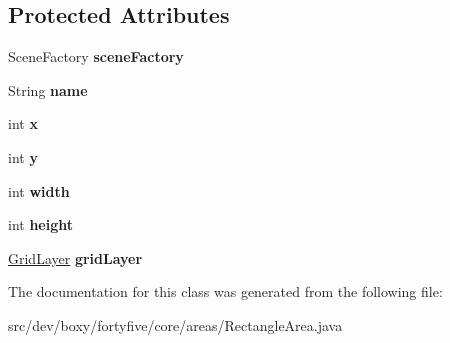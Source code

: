 \subsection*{Protected Attributes}
\begin{DoxyCompactItemize}
\item 
\hypertarget{classdev_1_1boxy_1_1fortyfive_1_1core_1_1areas_1_1_rectangle_area_aa347937afc00323c9ca949090c6725ca}{
SceneFactory {\bfseries sceneFactory}}
\label{d2/d2f/classdev_1_1boxy_1_1fortyfive_1_1core_1_1areas_1_1_rectangle_area_aa347937afc00323c9ca949090c6725ca}

\item 
\hypertarget{classdev_1_1boxy_1_1fortyfive_1_1core_1_1areas_1_1_rectangle_area_a8ea1c09ac73ac65b7850f53cdb48eb56}{
String {\bfseries name}}
\label{d2/d2f/classdev_1_1boxy_1_1fortyfive_1_1core_1_1areas_1_1_rectangle_area_a8ea1c09ac73ac65b7850f53cdb48eb56}

\item 
\hypertarget{classdev_1_1boxy_1_1fortyfive_1_1core_1_1areas_1_1_rectangle_area_af83d835179ccc2ab5389560992b01934}{
int {\bfseries x}}
\label{d2/d2f/classdev_1_1boxy_1_1fortyfive_1_1core_1_1areas_1_1_rectangle_area_af83d835179ccc2ab5389560992b01934}

\item 
\hypertarget{classdev_1_1boxy_1_1fortyfive_1_1core_1_1areas_1_1_rectangle_area_aad87f84305e125eb55f3401e80e6f7c6}{
int {\bfseries y}}
\label{d2/d2f/classdev_1_1boxy_1_1fortyfive_1_1core_1_1areas_1_1_rectangle_area_aad87f84305e125eb55f3401e80e6f7c6}

\item 
\hypertarget{classdev_1_1boxy_1_1fortyfive_1_1core_1_1areas_1_1_rectangle_area_a908d5eab93fa40c5d8b13fa4b8c3443b}{
int {\bfseries width}}
\label{d2/d2f/classdev_1_1boxy_1_1fortyfive_1_1core_1_1areas_1_1_rectangle_area_a908d5eab93fa40c5d8b13fa4b8c3443b}

\item 
\hypertarget{classdev_1_1boxy_1_1fortyfive_1_1core_1_1areas_1_1_rectangle_area_a30f5389bf069bbebab73886caf5661d4}{
int {\bfseries height}}
\label{d2/d2f/classdev_1_1boxy_1_1fortyfive_1_1core_1_1areas_1_1_rectangle_area_a30f5389bf069bbebab73886caf5661d4}

\item 
\hypertarget{classdev_1_1boxy_1_1fortyfive_1_1core_1_1areas_1_1_rectangle_area_a5f67deef94063bd5df65e482d741a398}{
\hyperlink{classdev_1_1boxy_1_1fortyfive_1_1_grid_layer}{GridLayer} {\bfseries gridLayer}}
\label{d2/d2f/classdev_1_1boxy_1_1fortyfive_1_1core_1_1areas_1_1_rectangle_area_a5f67deef94063bd5df65e482d741a398}

\end{DoxyCompactItemize}


The documentation for this class was generated from the following file:\begin{DoxyCompactItemize}
\item 
src/dev/boxy/fortyfive/core/areas/RectangleArea.java\end{DoxyCompactItemize}
